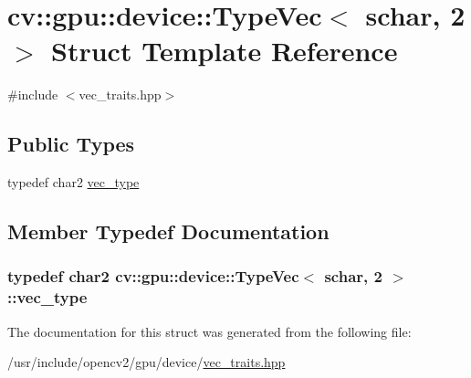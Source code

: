 \hypertarget{structcv_1_1gpu_1_1device_1_1TypeVec_3_01schar_00_012_01_4}{\section{cv\-:\-:gpu\-:\-:device\-:\-:Type\-Vec$<$ schar, 2 $>$ Struct Template Reference}
\label{structcv_1_1gpu_1_1device_1_1TypeVec_3_01schar_00_012_01_4}
}


{\ttfamily \#include $<$vec\-\_\-traits.\-hpp$>$}

\subsection*{Public Types}
\begin{DoxyCompactItemize}
\item 
typedef char2 \hyperlink{structcv_1_1gpu_1_1device_1_1TypeVec_3_01schar_00_012_01_4_a00c526ca2956bc4343f6042ecbea116a}{vec\-\_\-type}
\end{DoxyCompactItemize}


\subsection{Member Typedef Documentation}
\hypertarget{structcv_1_1gpu_1_1device_1_1TypeVec_3_01schar_00_012_01_4_a00c526ca2956bc4343f6042ecbea116a}{
\subsubsection[{vec\-\_\-type}]{\setlength{\rightskip}{0pt plus 5cm}typedef char2 {\bf cv\-::gpu\-::device\-::\-Type\-Vec}$<$ {\bf schar}, 2 $>$\-::{\bf vec\-\_\-type}}}\label{structcv_1_1gpu_1_1device_1_1TypeVec_3_01schar_00_012_01_4_a00c526ca2956bc4343f6042ecbea116a}


The documentation for this struct was generated from the following file\-:\begin{DoxyCompactItemize}
\item 
/usr/include/opencv2/gpu/device/\hyperlink{vec__traits_8hpp}{vec\-\_\-traits.\-hpp}\end{DoxyCompactItemize}
